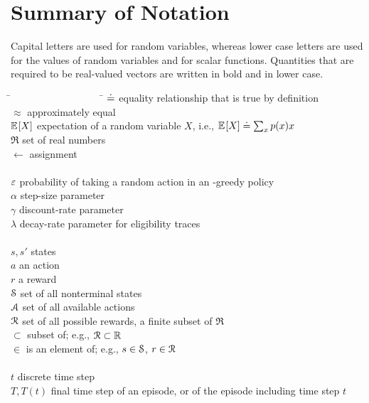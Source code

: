 \documentclass[a4paper, 12pt]{article}
\begin{document}
\section*{Summary of Notation} 
Capital letters are used for random variables, whereas lower case letters are used for
the values of random variables and for scalar functions. Quantities that are required to
be real-valued vectors are written in bold and in lower case.
\begin{tabbing}
    \=~~~~~~~~~~~~~~~~~~  \= \kill
    \>$\defeq$            \> equality relationship that is true by definition\\
    \>$\approx$           \> approximately equal\\
    \>$\E{X}$             \> expectation of a random variable $X$, i.e., $\E{X}\defeq\sum_x p(x)x$\\
    \>$\Re$               \> set of real numbers\\
    \>$\leftarrow$        \> assignment\\
    \\
    \>$\e$                \> probability of taking a random action in an \e-greedy policy\\
    \>$\alpha$            \> step-size parameter\\
    \>$\gamma$            \> discount-rate parameter\\
    \>$\lambda$           \> decay-rate parameter for eligibility traces\\
    \\
    \>$s, s'$             \> states\\
    \>$a$                 \> an action\\
    \>$r$                 \> a reward\\
    \>$\S$                \> set of all nonterminal states\\
    \>$\A$                \> set of all available actions\\
    \>$\R$                \> set of all possible rewards, a finite subset of $\Re$\\
    \>$\subset$           \> subset of; e.g., $\R\subset\Re$\\
    \>$\in$               \> is an element of; e.g., $s\in\S$, $r\in\R$\\
    \\
    \>$t$                 \> discrete time step\\
    \>$T, T(t)$           \> final time step of an episode, or of the episode including time step $t$\\

\end{tabbing}
\end{document}
